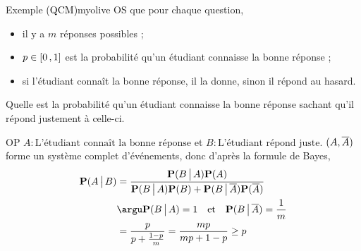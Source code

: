     \begin{omed}{Exemple \textcolor{black}{(QCM)}}{myolive}
        OS que pour chaque question, \begin{itemize}
            \item il y a $m$ réponses possibles ;
            \item $p \in \left[ 0 \, , 1 \right]$ est la probabilité qu’un étudiant connaisse la bonne réponse ;
            \item si l’étudiant connaît la bonne réponse, il la donne, sinon il répond au hasard.
        \end{itemize}
        Quelle est la probabilité qu’un étudiant connaisse la bonne réponse sachant qu’il répond justement à celle-ci.

        OP $A : \text{L’étudiant connaît la bonne réponse}$ et $B : \text{L’étudiant répond juste}$. $(A, \overline{A})$ forme un système complet d’événements, donc d’après la formule de Bayes, 
        \begin{align*}
            \mathbf{P}(A \tq B) 
            &= \frac{\mathbf{P}(B \tq A) \mathbf{P}(A)}{\mathbf{P}(B \tq A) \mathbf{P}(B) + \mathbf{P}(B \tq \barr{A}) \mathbf{P}(\barr{A})} \\
            &\argu \mathbf{P}(B \tq A) = 1 \esp{et} \mathbf{P}(B \tq \barr{A}) = \frac{1}{m} \\
            &= \frac{p}{p + \frac{1 - p}{m}} = \frac{mp}{mp + 1 - p} \geq p \\
        \end{align*}
    \end{omed}

